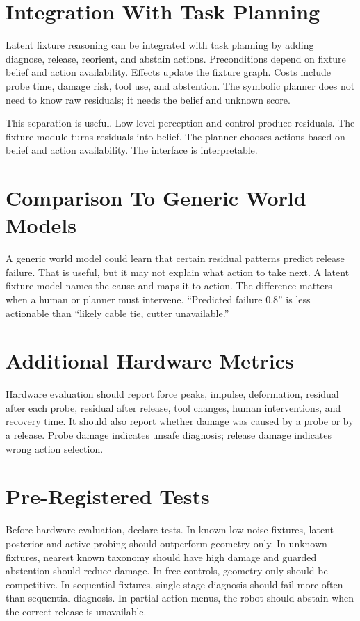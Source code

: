 \documentclass{article}
\begin{document}
\section{Integration With Task Planning}

Latent fixture reasoning can be integrated with task planning by adding
diagnose, release, reorient, and abstain actions. Preconditions depend on
fixture belief and action availability. Effects update the fixture graph. Costs
include probe time, damage risk, tool use, and abstention. The symbolic planner
does not need to know raw residuals; it needs the belief and unknown score.

This separation is useful. Low-level perception and control produce residuals.
The fixture module turns residuals into belief. The planner chooses actions
based on belief and action availability. The interface is interpretable.

\section{Comparison To Generic World Models}

A generic world model could learn that certain residual patterns predict
release failure. That is useful, but it may not explain what action to take
next. A latent fixture model names the cause and maps it to action. The
difference matters when a human or planner must intervene. ``Predicted failure
0.8'' is less actionable than ``likely cable tie, cutter unavailable.''

\section{Additional Hardware Metrics}

Hardware evaluation should report force peaks, impulse, deformation, residual
after each probe, residual after release, tool changes, human interventions,
and recovery time. It should also report whether damage was caused by a probe
or by a release. Probe damage indicates unsafe diagnosis; release damage
indicates wrong action selection.

\section{Pre-Registered Tests}

Before hardware evaluation, declare tests. In known low-noise fixtures, latent
posterior and active probing should outperform geometry-only. In unknown
fixtures, nearest known taxonomy should have high damage and guarded
abstention should reduce damage. In free controls, geometry-only should be
competitive. In sequential fixtures, single-stage diagnosis should fail more
often than sequential diagnosis. In partial action menus, the robot should
abstain when the correct release is unavailable.
\end{document}
